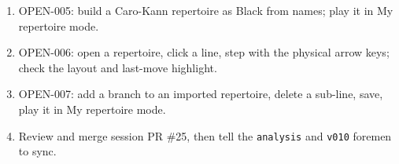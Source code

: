 \documentclass[11pt,a4paper]{article}
\begin{document}
\begin{enumerate}
  \item OPEN-005: build a Caro-Kann repertoire as Black from names; play it in My repertoire mode.
  \item OPEN-006: open a repertoire, click a line, step with the physical arrow keys; check the
        layout and last-move highlight.
  \item OPEN-007: add a branch to an imported repertoire, delete a sub-line, save, play it in My
        repertoire mode.
  \item Review and merge session PR \#25, then tell the \texttt{analysis} and \texttt{v010}
        foremen to sync.
\end{enumerate}
\end{document}

